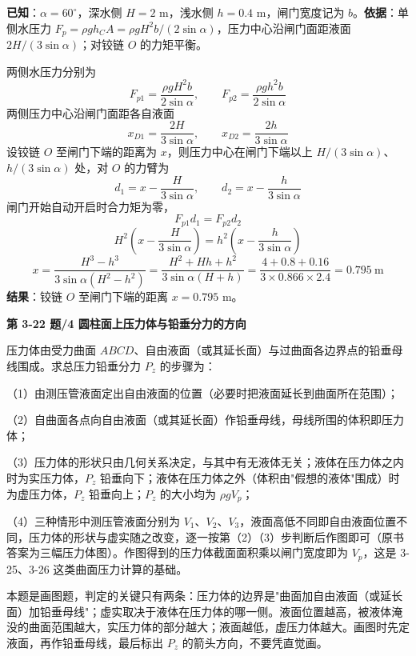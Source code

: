 \begin{jie}
\textbf{已知}：$\alpha=60^\circ$，深水侧 $H=2$ m，浅水侧 $h=0.4$ m，闸门宽度记为 $b$。\textbf{依据}：单侧水压力 $F_p=\rho gh_CA=\rho gH^2b/(2\sin\alpha)$，压力中心沿闸门面距液面 $2H/(3\sin\alpha)$；对铰链 $O$ 的力矩平衡。

两侧水压力分别为
\[ F_{p1}=\frac{\rho gH^2b}{2\sin\alpha},\qquad F_{p2}=\frac{\rho gh^2b}{2\sin\alpha} \]
两侧压力中心沿闸门面距各自液面
\[ x_{D1}=\frac{2H}{3\sin\alpha},\qquad x_{D2}=\frac{2h}{3\sin\alpha} \]
设铰链 $O$ 至闸门下端的距离为 $x$，则压力中心在闸门下端以上 $H/(3\sin\alpha)$、$h/(3\sin\alpha)$ 处，对 $O$ 的力臂为
\[ d_1=x-\frac{H}{3\sin\alpha},\qquad d_2=x-\frac{h}{3\sin\alpha} \]
闸门开始自动开启时合力矩为零，
\[ F_{p1}d_1=F_{p2}d_2 \]
\[ H^2\left(x-\frac{H}{3\sin\alpha}\right)=h^2\left(x-\frac{h}{3\sin\alpha}\right) \]
\[ x=\frac{H^3-h^3}{3\sin\alpha(H^2-h^2)}=\frac{H^2+Hh+h^2}{3\sin\alpha(H+h)}=\frac{4+0.8+0.16}{3\times0.866\times2.4}=0.795\ \mathrm{m} \]
\textbf{结果}：铰链 $O$ 至闸门下端的距离 $x=0.795$ m。
\end{jie}

\noindent\textbf{第 3-22 题/4 圆柱面上压力体与铅垂分力的方向}

\begin{jie}
压力体由受力曲面 $ABCD$、自由液面（或其延长面）与过曲面各边界点的铅垂母线围成。求总压力铅垂分力 $P_z$ 的步骤为：

（1）由测压管液面定出自由液面的位置（必要时把液面延长到曲面所在范围）；

（2）自曲面各点向自由液面（或其延长面）作铅垂母线，母线所围的体积即压力体；

（3）压力体的形状只由几何关系决定，与其中有无液体无关；液体在压力体之内时为实压力体，$P_z$ 铅垂向下；液体在压力体之外（体积由"假想的液体"围成）时为虚压力体，$P_z$ 铅垂向上；$P_z$ 的大小均为 $\rho gV_p$；

（4）三种情形中测压管液面分别为 $V_1$、$V_2$、$V_3$，液面高低不同即自由液面位置不同，压力体的形状与虚实随之改变，逐一按第（2）（3）步判断后作图即可（原书答案为三幅压力体图）。作图得到的压力体截面面积乘以闸门宽度即为 $V_p$，这是 3-25、3-26 这类曲面压力计算的基础。
\end{jie}

\begin{tishi}
本题是画图题，判定的关键只有两条：压力体的边界是"曲面加自由液面（或延长面）加铅垂母线"；虚实取决于液体在压力体的哪一侧。液面位置越高，被液体淹没的曲面范围越大，实压力体的部分越大；液面越低，虚压力体越大。画图时先定液面，再作铅垂母线，最后标出 $P_z$ 的箭头方向，不要凭直觉画。
\end{tishi}

